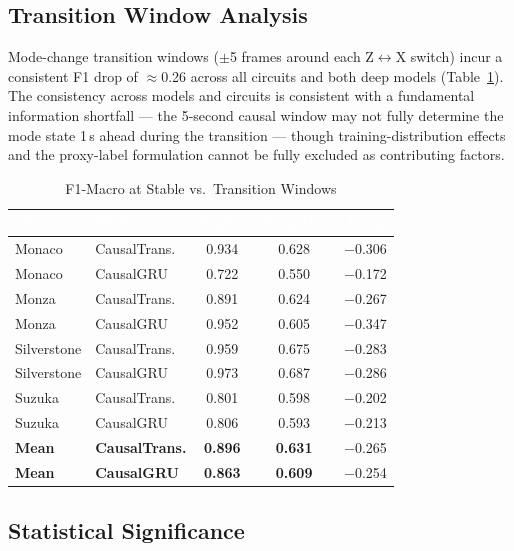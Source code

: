 \documentclass[conference,a4paper]{IEEEtran}
\begin{document}
\subsection{Transition Window Analysis}

Mode-change transition windows ($\pm$5 frames around each Z$\leftrightarrow$X switch)
incur a consistent F1 drop of $\approx$0.26 across all circuits and both deep models
(Table~\ref{tab:transition}). The consistency across models and circuits is consistent
with a fundamental information shortfall — the 5-second causal window may not fully
determine the mode state 1\,s ahead during the transition — though training-distribution
effects and the proxy-label formulation cannot be fully excluded as contributing factors.

\begin{table}[h]
\caption{F1-Macro at Stable vs.\ Transition Windows}
\label{tab:transition}
\centering
\small
\renewcommand{\arraystretch}{1.25}
\begin{tabular}{llccc}
\toprule
\rowcolor{hdrgreen}
\textcolor{white}{\textbf{Circuit}} &
\textcolor{white}{\textbf{Model}} &
\textcolor{white}{\textbf{Stable}} &
\textcolor{white}{\textbf{Transition}} &
\textcolor{white}{\textbf{Drop}} \\
\midrule
Monaco     & CausalTrans. & 0.934 & 0.628 & $-$0.306 \\
Monaco     & CausalGRU    & 0.722 & 0.550 & $-$0.172 \\
Monza      & CausalTrans. & 0.891 & 0.624 & $-$0.267 \\
Monza      & CausalGRU    & 0.952 & 0.605 & $-$0.347 \\
Silverstone& CausalTrans. & 0.959 & 0.675 & $-$0.283 \\
Silverstone& CausalGRU    & 0.973 & 0.687 & $-$0.286 \\
Suzuka     & CausalTrans. & 0.801 & 0.598 & $-$0.202 \\
Suzuka     & CausalGRU    & 0.806 & 0.593 & $-$0.213 \\
\midrule
\textbf{Mean} & \textbf{CausalTrans.} & \textbf{0.896} & \textbf{0.631} & $-$0.265 \\
\textbf{Mean} & \textbf{CausalGRU}    & \textbf{0.863} & \textbf{0.609} & $-$0.254 \\
\bottomrule
\end{tabular}
\end{table}

\subsection{Statistical Significance}
\end{document}
